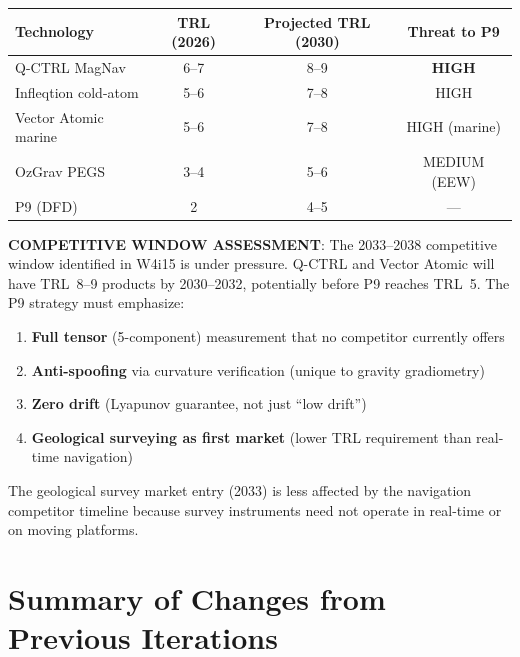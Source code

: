 \documentclass[11pt]{article}
\theoremstyle{definition}
\theoremstyle{remark}
\begin{document}
\begin{center}
\begin{tabular}{lccc}
\toprule
\textbf{Technology} & \textbf{TRL (2026)} & \textbf{Projected TRL (2030)} & \textbf{Threat to P9} \\
\midrule
Q-CTRL MagNav & 6--7 & 8--9 & \textbf{HIGH} \\
Infleqtion cold-atom & 5--6 & 7--8 & HIGH \\
Vector Atomic marine & 5--6 & 7--8 & HIGH (marine) \\
OzGrav PEGS & 3--4 & 5--6 & MEDIUM (EEW) \\
P9 (DFD) & 2 & 4--5 & --- \\
\bottomrule
\end{tabular}
\end{center}

\begin{tcolorbox}[colback=orange!5!white, colframe=orange!70!black]
\textbf{COMPETITIVE WINDOW ASSESSMENT}: The 2033--2038 competitive
window identified in W4i15 is under pressure. Q-CTRL and Vector Atomic
will have TRL~8--9 products by 2030--2032, potentially before P9
reaches TRL~5. The P9 strategy must emphasize:
\begin{enumerate}
  \item \textbf{Full tensor} (5-component) measurement that no competitor
    currently offers
  \item \textbf{Anti-spoofing} via curvature verification (unique to gravity
    gradiometry)
  \item \textbf{Zero drift} (Lyapunov guarantee, not just ``low drift'')
  \item \textbf{Geological surveying as first market} (lower TRL requirement
    than real-time navigation)
\end{enumerate}
The geological survey market entry (2033) is less affected by the
navigation competitor timeline because survey instruments need not
operate in real-time or on moving platforms.
\end{tcolorbox}

\section*{Summary of Changes from Previous Iterations}
\end{document}
